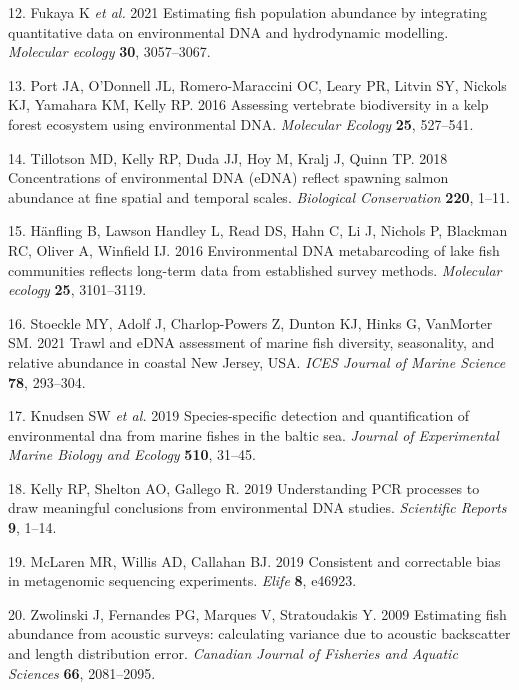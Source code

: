 \documentclass[
]{article}
\begin{document}
\leavevmode\hypertarget{ref-Fukaya2020estimating}{}%
12. Fukaya K \emph{et al.} 2021 Estimating fish population abundance by
integrating quantitative data on environmental DNA and hydrodynamic
modelling. \emph{Molecular ecology} \textbf{30}, 3057--3067.

\leavevmode\hypertarget{ref-port2016assessing}{}%
13. Port JA, O'Donnell JL, Romero-Maraccini OC, Leary PR, Litvin SY,
Nickols KJ, Yamahara KM, Kelly RP. 2016 Assessing vertebrate
biodiversity in a kelp forest ecosystem using environmental DNA.
\emph{Molecular Ecology} \textbf{25}, 527--541.

\leavevmode\hypertarget{ref-tillotson2018concentrations}{}%
14. Tillotson MD, Kelly RP, Duda JJ, Hoy M, Kralj J, Quinn TP. 2018
Concentrations of environmental DNA (eDNA) reflect spawning salmon
abundance at fine spatial and temporal scales. \emph{Biological
Conservation} \textbf{220}, 1--11.

\leavevmode\hypertarget{ref-hanfling2016gillnet}{}%
15. Hänfling B, Lawson Handley L, Read DS, Hahn C, Li J, Nichols P,
Blackman RC, Oliver A, Winfield IJ. 2016 Environmental DNA metabarcoding
of lake fish communities reflects long-term data from established survey
methods. \emph{Molecular ecology} \textbf{25}, 3101--3119.

\leavevmode\hypertarget{ref-stoeckle2021trawl}{}%
16. Stoeckle MY, Adolf J, Charlop-Powers Z, Dunton KJ, Hinks G,
VanMorter SM. 2021 Trawl and eDNA assessment of marine fish diversity,
seasonality, and relative abundance in coastal New Jersey, USA.
\emph{ICES Journal of Marine Science} \textbf{78}, 293--304.

\leavevmode\hypertarget{ref-knudsen2019species}{}%
17. Knudsen SW \emph{et al.} 2019 Species-specific detection and
quantification of environmental dna from marine fishes in the baltic
sea. \emph{Journal of Experimental Marine Biology and Ecology}
\textbf{510}, 31--45.

\leavevmode\hypertarget{ref-kelly2019understanding}{}%
18. Kelly RP, Shelton AO, Gallego R. 2019 Understanding PCR processes to
draw meaningful conclusions from environmental DNA studies.
\emph{Scientific Reports} \textbf{9}, 1--14.

\leavevmode\hypertarget{ref-mclaren2019consistent}{}%
19. McLaren MR, Willis AD, Callahan BJ. 2019 Consistent and correctable
bias in metagenomic sequencing experiments. \emph{Elife} \textbf{8},
e46923.

\leavevmode\hypertarget{ref-zwolinski2009estimating}{}%
20. Zwolinski J, Fernandes PG, Marques V, Stratoudakis Y. 2009
Estimating fish abundance from acoustic surveys: calculating variance
due to acoustic backscatter and length distribution error.
\emph{Canadian Journal of Fisheries and Aquatic Sciences} \textbf{66},
2081--2095.
\end{document}
